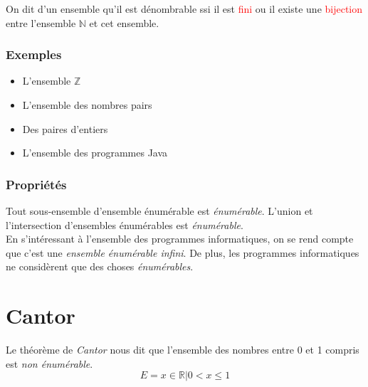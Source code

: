 \documentclass{report}
\begin{document}
On dit d'un ensemble qu'il est dénombrable ssi il est \textcolor{red}{fini} ou il existe une \textcolor{red}{bijection} entre l'ensemble $\mathbb{N}$ et cet ensemble.

\subsubsection{Exemples}
\begin{itemize}
\item L'ensemble $\mathbb{Z}$
\item L'ensemble des nombres pairs
\item Des paires d'entiers
\item L'ensemble des programmes Java
\end{itemize}

\subsubsection{Propriétés}
Tout sous-ensemble d'ensemble énumérable est \textit{énumérable}. L'union et l'intersection d'ensembles énumérables est \textit{énumérable}.\\

En s'intéressant à l'ensemble des programmes informatiques, on se rend compte que c'est une \textit{ensemble énumérable infini}. De plus, les programmes informatiques ne considèrent que des choses \textit{énumérables}.

\section{Cantor}
Le théorème de \textit{Cantor} nous dit que l'ensemble des nombres entre 0 et 1 compris est \textit{non énumérable}.
\begin{equation}
E = {x \in \mathbb{R} | 0 < x \le 1}
\end{equation}
\end{document}
